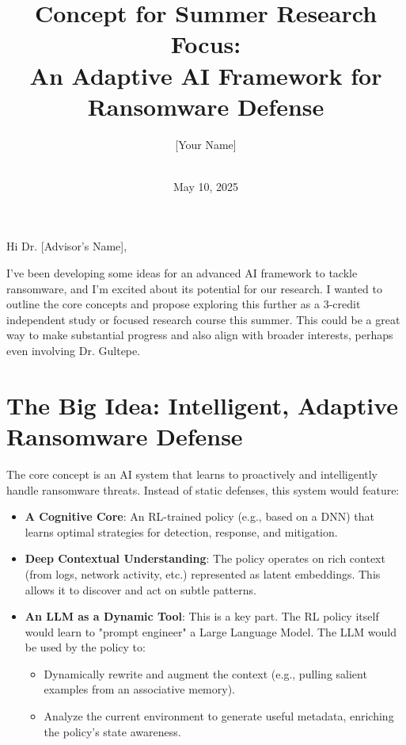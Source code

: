 \documentclass[11pt]{article}
\title{\textbf{Concept for Summer Research Focus: \\ An Adaptive AI Framework for Ransomware Defense}}
\author{
    [Your Name] \\
    [Your Department] \\
    [Your University]
}
\date{May 10, 2025}
\begin{document}
\maketitle
\par\vspace{1em} %

Hi Dr. [Advisor's Name],

I've been developing some ideas for an advanced AI framework to tackle ransomware, and I'm excited about its potential for our research. I wanted to outline the core concepts and propose exploring this further as a 3-credit independent study or focused research course this summer. This could be a great way to make substantial progress and also align with broader interests, perhaps even involving Dr. Gultepe.

\section*{The Big Idea: Intelligent, Adaptive Ransomware Defense}

The core concept is an AI system that learns to proactively and intelligently handle ransomware threats. Instead of static defenses, this system would feature:

\begin{itemize}
    \item \textbf{A Cognitive Core}: An RL-trained policy (e.g., based on a DNN) that learns optimal strategies for detection, response, and mitigation.
    \item \textbf{Deep Contextual Understanding}: The policy operates on rich context (from logs, network activity, etc.) represented as latent embeddings. This allows it to discover and act on subtle patterns.
    \item \textbf{An LLM as a Dynamic Tool}: This is a key part. The RL policy itself would learn to "prompt engineer" a Large Language Model. The LLM would be used by the policy to:
        \begin{itemize}
            \item Dynamically rewrite and augment the context (e.g., pulling salient examples from an associative memory).
            \item Analyze the current environment to generate useful metadata, enriching the policy's state awareness.
        \end{itemize}
\end{itemize}
\end{document}
